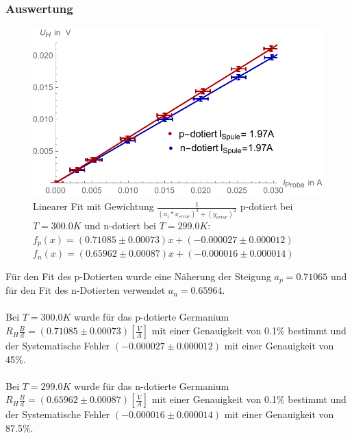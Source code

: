 \subsubsection{Auswertung}
\begin{figure}[H]
	\centering
\includegraphics[width=0.9\linewidth]{IMAGE/M31_Fit.pdf}
	\caption{Linearer Fit mit Gewichtung $\frac{1}{(a_{i}*x_{error})^2+(y_{error})^2}$ p-dotiert bei $T=300.0K$ und n-dotiert bei $T=299.0K$:\\ $f_{p}(x)=(0.71085 \pm 0.00073)x + (-0.000027 \pm 0.000012)$\\ $f_{n}(x)=(0.65962 \pm 0.00087)x + (-0.000016 \pm 0.000014)$}
	\label{fig:M3_1_1}
\end{figure} 


Für den Fit  des p-Dotierten wurde eine Näherung der Steigung  $a_{p}=0.71065$  und für den Fit des n-Dotierten verwendet $a_{n}=0.65964$.\\
\\
Bei $T=300.0K$ wurde für das p-dotierte Germanium  $R_{H}\frac{B}{d}=(0.71085 \pm 0.00073) [\frac{V}{A}]$ mit einer Genauigkeit von 0.1\% bestimmt und\\
der Systematische Fehler $(-0.000027 \pm 0.000012)$ mit einer Genauigkeit von 45\%.\\
\\
Bei $T=299.0K$ wurde für das n-dotierte Germanium $R_{H}\frac{B}{d}=(0.65962 \pm 0.00087) [\frac{V}{A}]$ mit einer Genauigkeit von 0.1\% bestimmt und\\ der Systematische Fehler $(-0.000016 \pm 0.000014)$ mit einer Genauigkeit von 87.5\%.\\


\listoffigures
\listoftables

